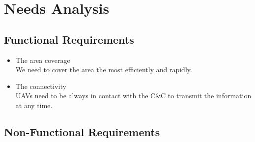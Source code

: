 \chapter{Needs Analysis}
\section{Functional Requirements}

\begin{itemize}

\item The area coverage\\
We need to cover the area the most efficiently and rapidly.

\item The connectivity\\
UAVs need to be always in contact with the C\&C to transmit the information at any time.

\end{itemize}

\section{Non-Functional Requirements}